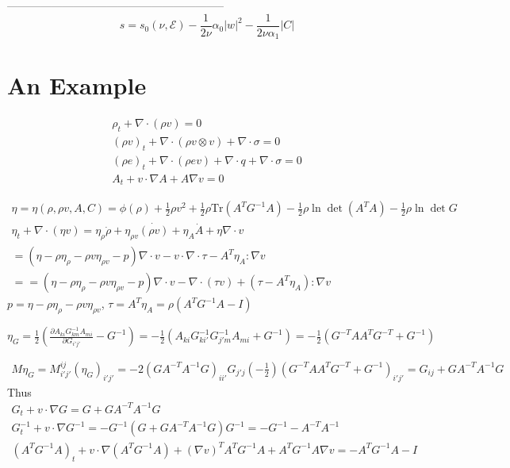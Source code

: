 \documentclass{article}
\begin{document}
-----------------------------------------------------------
$$s = s_0(\nu,\mathcal{E}) - \frac{1}{2\nu} \alpha_0 |w|^2 - \frac{1}{2\nu\alpha_1} |C|$$


\section{An Example}
\begin{subequations}
\begin{align}
\rho_t + \nabla \cdot (\rho v )=0 \\
(\rho v)_t + \nabla \cdot (\rho v \otimes v) + \nabla \cdot \sigma = 0 \\
(\rho e)_t + \nabla \cdot (\rho e v) + \nabla \cdot q + \nabla \cdot \sigma = 0 \\
A_t + v \cdot \nabla A + A \nabla v = 0
\end{align}
\end{subequations}


\begin{eqnarray*}
\eta = \eta (\rho, \rho v, A, C)  = \phi(\rho) + \frac{1}{2} \rho v^2 + \frac{1}{2}\rho \mbox{Tr} (A^T G^{-1} A)  - \frac{1}{2} \rho \ln \det (A^TA) - \frac{1}{2} \rho \ln \det G \\
\eta_t + \nabla \cdot (\eta v ) = \eta_{\rho} \dot{\rho} + \eta_{\rho v} \dot {(\rho v)}  + \eta_{A} \dot{A}  + \eta \nabla \cdot v\\
= (\eta - \rho \eta_\rho -\rho v \eta_{\rho v} -p) \nabla \cdot v - v \cdot \nabla \cdot \tau  - A^T \eta_A : \nabla v	\\
== (\eta - \rho \eta_\rho -\rho v \eta_{\rho v} -p) \nabla \cdot v -  \nabla \cdot (\tau v)  + (\tau- A^T \eta_A ): \nabla v	
\end{eqnarray*}
$p = \eta - \rho \eta_\rho -\rho v \eta_{\rho v}$, $\tau = A^T\eta_A = \rho (A^T G^{-1} A - I)$

$\eta_{G} =\frac{1}{2} ( \frac{\partial A_{ki}G^{-1}_{km}  A_{mi} }{\partial G_{i'j'}} -G^{-1} )  = -\frac{1}{2} (A_{ki} G^{-1}_{ki'} G^{-1}_{j'm} A_{mi} + G^{-1}) = -\frac{1}{2} (G^{-T}A A^T G^{-T} + G^{-1}) $

\begin{eqnarray*}
M \eta_G = M_{i'j'}^{ij} (\eta_{G})_{i'j'} =  -2 (GA^{-T}A^{-1} G)_{ii'} G_{j'j} (-\frac{1}{2}) (G^{-T}A A^T G^{-T} + G^{-1})_{i'j'} = G_{ij} + GA^{-T}A^{-1} G
\end{eqnarray*}
Thus
\begin{eqnarray*}
G_t + v \cdot \nabla G  = G + G A^{-T} A^{-1} G \\
G^{-1}_t + v \cdot \nabla G^{-1}  =-G^{-1}( G + G A^{-T} A^{-1} G )G^{-1} = -G^{-1} - A^{-T}A^{-1}  \\
(A^T G^{-1} A)_t +  v \cdot \nabla (A^T G^{-1} A) + (\nabla v)^T A^T G^{-1} A + A^T G^{-1} A \nabla v= - A^T G^{-1} A - I
\end{eqnarray*}
\end{document}
